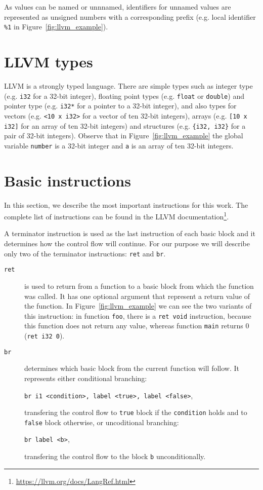 As values can be named or unnnamed, identifiers for unnamed values are
represented as unsigned numbers with a corresponding prefix (e.g. local
identifier \texttt{\%1} in Figure~\ref{fig:llvm_example}).

\section{LLVM types}

LLVM is a strongly typed language. There are simple types such as integer type
(e.g. \texttt{i32} for a 32-bit integer), floating point types (e.g.
\texttt{float} or \texttt{double}) and pointer type (e.g. \texttt{i32*} for a
pointer to a 32-bit integer), and also types for vectors (e.g. \texttt{<10 x
i32>} for a vector of ten 32-bit integers), arrays (e.g. \texttt{[10 x i32]}
for an array of ten 32-bit integers) and structures (e.g. \texttt{\{i32, i32\}}
for a pair of 32-bit integers). Observe that in Figure~\ref{fig:llvm_example}
the global variable \texttt{number} is a 32-bit integer and
\texttt{a} is an array of ten 32-bit integers.

\section{Basic instructions}

In this section, we describe the most important instructions for this work. The
complete list of instructions can be found in the LLVM
documentation\footnote{\url{https://llvm.org/docs/LangRef.html}}.

A terminator instruction is used as the last instruction of each basic block
and it determines how the control flow will continue. For our purpose we will
describe only two of the terminator instructions: \texttt{ret} and \texttt{br}.

\begin{description}
\item[\texttt{ret}] is used to return from a function to a basic block
from which the function was called. It has one optional argument that represent
a return value of the function. In Figure~\ref{fig:llvm_example} we can see the
two variants of this instruction: in function \texttt{foo}, there is a
\texttt{ret void} instruction, because this function does not return any value,
whereas function \texttt{main} returns 0 (\texttt{ret i32 0}).

\item[\texttt{br}] determines which basic block from the current function
will follow. It represents either conditional branching:

\texttt{br i1 <condition>, label <true>, label <false>},

transfering the control flow to \texttt{true} block if the \texttt{condition} holds and to
\texttt{false} block otherwise, or uncoditional branching:

\texttt{br label <b>},

transfering the control flow to the block \texttt{b} unconditionally.
\end{description}

